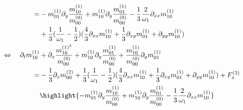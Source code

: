 \documentclass{article}
\begin{document}
\begin{align*}
    \\ = &
    - m_{01}^{(1)}\partial_y \frac{ m_{10}^{(1)}}{m_{00}^{(0)}}
    + m_{10}^{(1)}\partial_y \frac{ m_{01}^{(1)}}{m_{00}^{(0)}}
    - \frac{1}{3}\frac{2}{\omega_1} \partial_{xx} m_{10}^{(1)}
    \\ &
    + \frac{1}{3}(\frac{1}{\omega_1} - \frac{1}{2}) (\frac{4}{3}\partial_{xx} m_{10}^{(1)} + \frac{1}{3}\partial_{xy} m_{01}^{(1)}  + \partial_{yy} m_{10}^{(1)})
    \\\Leftrightarrow\quad   \partial_t m_{10}^{(1)} &
    + \partial_x \frac{ m_{10}^{{(1)}^2}}{ m_{00}^{(0)}}
    + m_{10}^{(1)}\partial_y \frac{ m_{01}^{(1)}}{m_{00}^{(0)}}
    + \frac{ m_{10}^{(1)}}{m_{00}^{(0)}}\partial_y m_{01}^{(1)}
    \\ = &
    - \frac{1}{3}\partial_x m_{00}^{(2)}
    + \frac{1}{3}(\frac{1}{\omega_1} - \frac{1}{2}) (\frac{4}{3}\partial_{xx} m_{10}^{(1)} + \frac{1}{3}\partial_{xy} m_{01}^{(1)}  + \partial_{yy} m_{10}^{(1)})
    + F_x^{(3)}
    \\ &
    \highlight{
    - m_{01}^{(1)}\partial_y \frac{ m_{10}^{(1)}}{m_{00}^{(0)}}
    + m_{10}^{(1)}\partial_y \frac{ m_{01}^{(1)}}{m_{00}^{(0)}}
    - \frac{1}{3}\frac{2}{\omega_1} \partial_{xx} m_{10}^{(1)}
    }
\end{align*}
\end{document}
